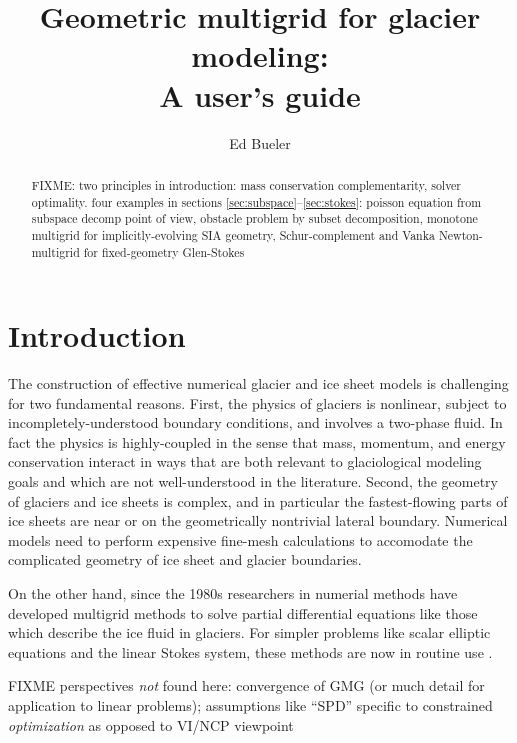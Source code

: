 \documentclass[letterpaper,final,12pt,reqno]{amsart}
\begin{document}
\title[Geometric multigrid for glacier modeling]{Geometric multigrid for glacier modeling: \\ A user's guide}

\author{Ed Bueler}

\begin{abstract} FIXME: two principles in introduction: mass conservation complementarity, solver optimality.  four examples in sections \ref{sec:subspace}--\ref{sec:stokes}: poisson equation from subspace decomp point of view, obstacle problem by subset decomposition, monotone multigrid for implicitly-evolving SIA geometry, Schur-complement and Vanka Newton-multigrid for fixed-geometry Glen-Stokes
\end{abstract}

\maketitle

\thispagestyle{empty}
\bigskip

\section{Introduction} \label{sec:intro}

The construction of effective numerical glacier and ice sheet models is challenging for two fundamental reasons.  First, the physics of glaciers is nonlinear, subject to incompletely-understood boundary conditions, and involves a two-phase fluid.  In fact the physics is highly-coupled in the sense that mass, momentum, and energy conservation interact in ways that are both relevant to glaciological modeling goals and which are not well-understood in the literature.  Second, the geometry of glaciers and ice sheets is complex, and in particular the fastest-flowing parts of ice sheets are near or on the geometrically nontrivial lateral boundary.  Numerical models need to perform expensive fine-mesh calculations to accomodate the complicated geometry of ice sheet and glacier boundaries.

On the other hand, since the 1980s researchers in numerial methods have developed multigrid methods to solve partial differential equations like those which describe the ice fluid in glaciers.   For simpler problems like scalar elliptic equations and the linear Stokes system, these methods are now in routine use \cite{Briggsetal2000,Bueler2021,Trottenbergetal2001}.

FIXME perspectives \emph{not} found here: convergence of GMG (or much detail for application to linear problems); assumptions like ``SPD'' specific to constrained \emph{optimization} as opposed to VI/NCP viewpoint
\end{document}
